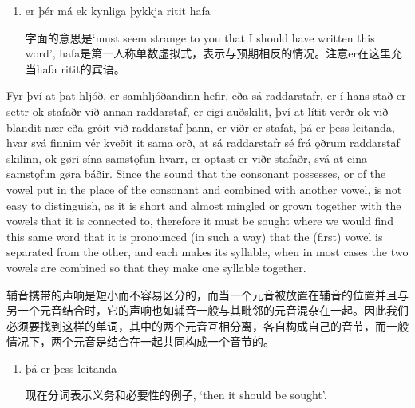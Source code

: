 \begin{grammar*}{}
  \begin{enumerate}[leftmargin=*]
    \item er þér má ek kynliga þykkja ritit hafa

          字面的意思是`must seem strange to you that I should have written this word',  hafa是第一人称单数虚拟式，表示与预期相反的情况。注意er在这里充当hafa ritit的宾语。
  \end{enumerate}
\end{grammar*}
\begin{paracol}{2}
  Fyr því at þat hljóð, er samhljóðandinn hefir, eða sá raddarstafr, er í hans stað er settr ok stafaðr við annan raddarstaf, er eigi auðskilit, því at lítit verðr ok við blandit nær eða gróit við raddarstaf þann, er viðr er stafat, þá er þess leitanda, hvar svá finnim vér kveðit it sama orð, at sá raddarstafr sé frá ǫðrum raddarstaf skilinn, ok gøri sína samstǫfun hvarr, er optast er viðr stafaðr, svá at eina samstǫfun gøra báðir.
  \switchcolumn
  Since the sound that the consonant possesses, or of the vowel put in the place of the consonant and combined with another vowel, is not easy to distinguish, as it is short and almost mingled or grown together with the vowels that it is connected to, therefore it must be sought where we would find this same word that it is pronounced (in such a way) that the (first) vowel is separated from the other, and each makes its syllable, when in most cases the two vowels are combined so that they make one syllable together.
\end{paracol}
\begin{translation*}{}
  辅音携带的声响是短小而不容易区分的，而当一个元音被放置在辅音的位置并且与另一个元音结合时，它的声响也如辅音一般与其毗邻的元音混杂在一起。因此我们必须要找到这样的单词，其中的两个元音互相分离，各自构成自己的音节，而一般情况下，两个元音是结合在一起共同构成一个音节的。
\end{translation*}
\begin{grammar*}{}
  \begin{enumerate}[leftmargin=*]
    \item þá er þess leitanda

          现在分词表示义务和必要性的例子, `then it should be sought'.
  \end{enumerate}
\end{grammar*}
